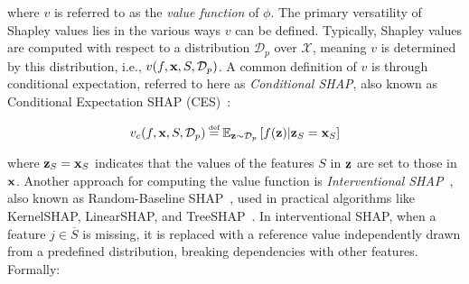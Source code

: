 where $v$ is referred to as the \emph{value function} of $\phi$. The primary versatility of Shapley values lies in the various ways $v$ can be defined. Typically, Shapley values are computed with respect to a distribution $\mathcal{D}_p$ over $\mathcal{X}$, meaning $v$ is determined by this distribution, i.e., $v(f,\textbf{x},S,\mathcal{D}_p)$. A common definition of $v$ is through conditional expectation, referred to here as \emph{Conditional SHAP}, also known as Conditional Expectation SHAP (CES)~\citep{sundararajan20b}:



\begin{equation}
    v_c(f,\x,S, \mathcal{D}_p) \myeq \mathbb{E}_{\z \sim \mathcal{D}_p} \left[ f(\z) | \z_S=\x_S \right]
\end{equation}

where $\textbf{z}_S=\textbf{x}_S$ indicates that the values of the features $S$ in $\textbf{z}$ are set to those in $\textbf{x}$. Another approach for computing the value function is \emph{Interventional SHAP}~\citep{janzing20a}, also known as Random-Baseline SHAP~\citep{sundararajan20b}, used in practical algorithms like KernelSHAP, LinearSHAP, and TreeSHAP~\citep{lundberg2017, lundbergnature}. In interventional SHAP, when a feature $j \in \overline{S}$ is missing, it is replaced with a reference value independently drawn from a predefined distribution, breaking dependencies with other features. Formally:


